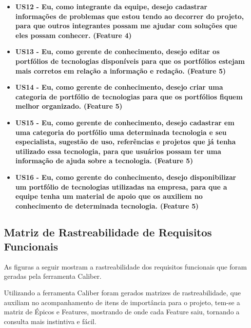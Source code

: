 \begin{itemize}
\item \textbf{US12 - Eu, como integrante da equipe, desejo cadastrar informações de problemas que estou tendo ao decorrer do projeto, para que outros integrantes possam me ajudar com soluções que eles possam conhecer. (Feature 4)}
\item \textbf{US13 - Eu, como gerente de conhecimento, desejo editar os portfólios de tecnologias disponíveis para que os portfólios estejam mais corretos em relação a informação e redação. (Feature 5)}
\item \textbf{US14 - Eu, como gerente de conhecimento, desejo criar uma categoria de portfólio de tecnologias para que os portfólios fiquem melhor organizado. (Feature 5)}
\item \textbf{US15 - Eu, como gerente de conhecimento, desejo cadastrar em uma categoria do portfólio uma determinada tecnologia e seu especialista, sugestão de uso, referências e projetos que já tenha utilizado essa tecnologia, para que usuários possam ter uma informação de ajuda sobre a tecnologia. (Feature 5)}
\item \textbf{US16 - Eu, como gerente do conhecimento, desejo disponibilizar um portfólio de tecnologias utilizadas na empresa, para que a equipe  tenha um material de apoio que os auxiliem no conhecimento de determinada tecnologia. (Feature 5)}
\end{itemize}

\subsection{Matriz de Rastreabilidade de Requisitos Funcionais}

As figuras a seguir mostram a rastreabilidade dos requisitos funcionais que foram geradas pela ferramenta Caliber.

Utilizando a ferramenta Caliber foram gerados matrizes de rastreabilidade, que auxiliam no acompanhamento de itens de importância para o projeto, tem-se  a matriz de Épicos e Features, mostrando de onde cada Feature saiu, tornando a consulta mais instintiva e fácil.

